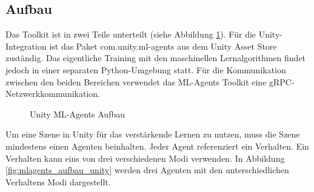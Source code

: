 \subsection{Aufbau}
Das Toolkit ist in zwei Teile unterteilt (siehe Abbildung \ref{fig:mlagents_aufbau}). Für die Unity-Integration ist das Paket com.unity.ml-agents aus dem Unity Asset Store zuständig. Das eigentliche Training mit den maschinellen Lernalgorithmen findet jedoch in einer separaten Python-Umgebung statt. Für die Kommunikation zwischen den beiden Bereichen verwendet das ML-Agents Toolkit eine gRPC-Netzwerkkommunikation.\cite{juliani2020}

\begin{figure}[H]
  \centering  
  \caption{Unity ML-Agents Aufbau}
  \label{fig:mlagents_aufbau}
\end{figure}

Um eine Szene in Unity für das verstärkende Lernen zu nutzen, muss die Szene mindestens einen Agenten beinhalten. Jeder Agent referenziert ein Verhalten. Ein Verhalten kann eins von drei verschiedenen Modi verwenden. In Abbildung \ref{fig:mlagents_aufbau_unity} werden drei Agenten mit den unterschiedlichen Verhaltens Modi dargestellt.

